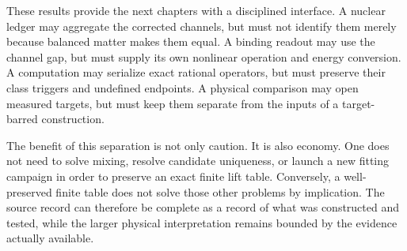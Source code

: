 These results provide the next chapters with a disciplined interface. A nuclear ledger may aggregate the corrected channels, but must not identify them merely because balanced matter makes them equal. A binding readout may use the channel gap, but must supply its own nonlinear operation and energy conversion. A computation may serialize exact rational operators, but must preserve their class triggers and undefined endpoints. A physical comparison may open measured targets, but must keep them separate from the inputs of a target-barred construction.

The benefit of this separation is not only caution. It is also economy. One does not need to solve mixing, resolve candidate uniqueness, or launch a new fitting campaign in order to preserve an exact finite lift table. Conversely, a well-preserved finite table does not solve those other problems by implication. The source record can therefore be complete as a record of what was constructed and tested, while the larger physical interpretation remains bounded by the evidence actually available.

\endgroup
